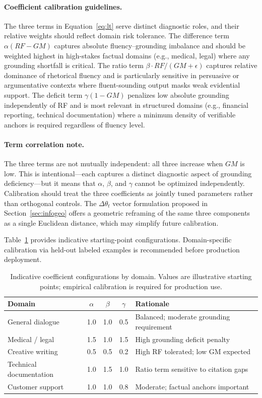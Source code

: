 \documentclass[11pt,a4paper]{article}
\begin{document}
\paragraph{Coefficient calibration guidelines.}
The three terms in Equation~\ref{eq:lt} serve distinct diagnostic roles, and their relative
weights should reflect domain risk tolerance.
The difference term $\alpha(RF - GM)$ captures absolute fluency--grounding imbalance and
should be weighted highest in high-stakes factual domains (e.g., medical, legal) where
any grounding shortfall is critical.
The ratio term $\beta \cdot RF/(GM+\epsilon)$ captures relative dominance of rhetorical
fluency and is particularly sensitive in persuasive or argumentative contexts where
fluent-sounding output masks weak evidential support.
The deficit term $\gamma(1-GM)$ penalizes low absolute grounding independently of RF
and is most relevant in structured domains (e.g., financial reporting, technical
documentation) where a minimum density of verifiable anchors is required regardless
of fluency level.

\paragraph{Term correlation note.}
The three terms are not mutually independent: all three increase when $GM$ is low.
This is intentional---each captures a distinct diagnostic aspect of grounding
deficiency---but it means that $\alpha$, $\beta$, and $\gamma$ cannot be optimized
independently. Calibration should treat the three coefficients as jointly tuned
parameters rather than orthogonal controls.
The $\Delta\theta_t$ vector formulation proposed in Section~\ref{sec:infogeo}
offers a geometric reframing of the same three components as a single Euclidean
distance, which may simplify future calibration.

Table~\ref{tab:coeff_guidance} provides indicative starting-point configurations.
Domain-specific calibration via held-out labeled examples is recommended before
production deployment.

\begin{table}[h]
\centering
\caption{Indicative coefficient configurations by domain. Values are illustrative
starting points; empirical calibration is required for production use.}
\label{tab:coeff_guidance}
\begin{tabular}{@{}lcccl@{}}
\toprule
Domain & $\alpha$ & $\beta$ & $\gamma$ & Rationale \\
\midrule
General dialogue     & 1.0 & 1.0 & 0.5 & Balanced; moderate grounding requirement \\
Medical / legal      & 1.5 & 1.0 & 1.5 & High grounding deficit penalty \\
Creative writing     & 0.5 & 0.5 & 0.2 & High RF tolerated; low GM expected \\
Technical documentation & 1.0 & 1.5 & 1.0 & Ratio term sensitive to citation gaps \\
Customer support     & 1.0 & 1.0 & 0.8 & Moderate; factual anchors important \\
\bottomrule
\end{tabular}
\end{table}
\end{document}
